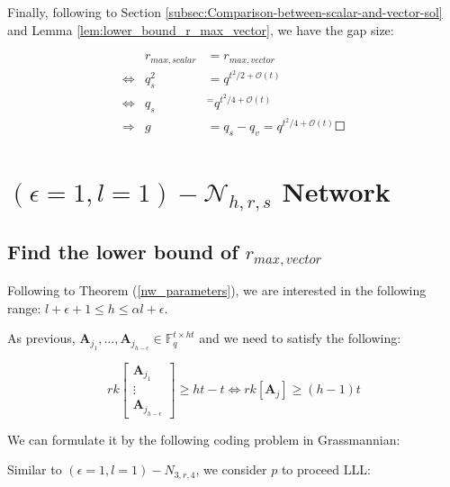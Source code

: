 Finally, following to Section \ref{subsec:Comparison-between-scalar-and-vector-sol}
and Lemma \ref{lem:lower_bound_r_max_vector}, we have the gap size:

\begin{eqnarray}
 & r_{max,scalar} & =r_{max,vector}\nonumber \\
\Leftrightarrow & q_{s}^{2} & =q^{t^{2}/2+\mathcal{O}(t)}\nonumber \\
\Leftrightarrow & q_{s} & ^{=}q^{t^{2}/4+\mathcal{O}(t)}\nonumber \\
\Rightarrow & g & =q_{s}-q_{v}=q^{t^{2}/4+\mathcal{O}(t)}\Square\label{eq:gap_e1l1h3rs4}
\end{eqnarray}


\section{$\left(\epsilon=1,l=1\right)-\mathcal{N}_{h,r,s}$ Network}

\subsection{Find the lower bound of $r_{max,vector}$}

Following to Theorem (\ref{nw_parameters}), we are interested in
the following range: $l+\epsilon+1\leq h\leq\alpha l+\epsilon$.

As previous, $\boldsymbol{A}_{j_{1}},\ldots,\boldsymbol{A}_{j_{h-\epsilon}}\in\ensuremath{\mathbb{F}}_{q}^{t\times ht}$
and we need to satisfy the following:

\[
rk\left[\begin{array}{c}
\boldsymbol{A}_{j_{1}}\\
\vdots\\
\boldsymbol{A}_{j_{h-\epsilon}}
\end{array}\right]\geq ht-t\Leftrightarrow rk\left[\boldsymbol{A}_{j}\right]\geq(h-1)t
\]

We can formulate it by the following coding problem in Grassmannian:

\noindent{}

Similar to $\left(\epsilon=1,l=1\right)-\ensuremath{N}_{3,r,4}$,
we consider $p$ to proceed LLL:

